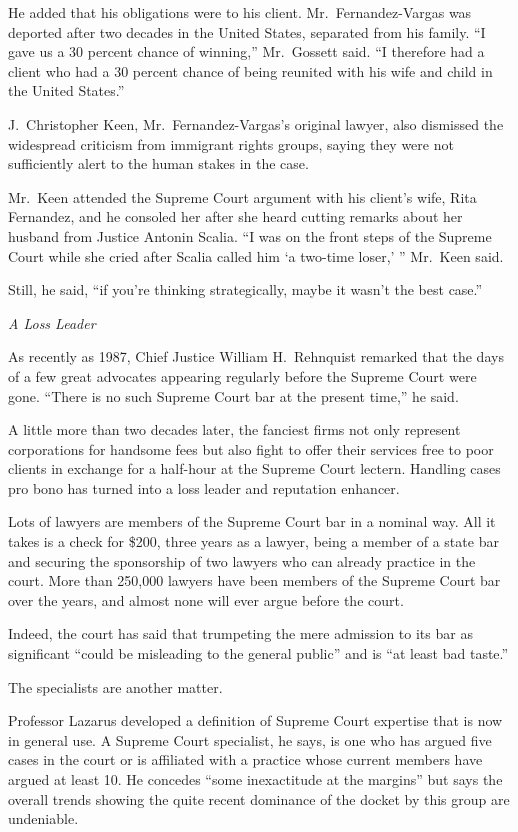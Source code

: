 ﻿\documentclass[12pt]{article}
\begin{document}
He added that his obligations were to his client. Mr.~Fernandez-Vargas was deported after two
decades in the United States, separated from his family. ``I gave us a 30 percent chance of
winning,'' Mr.~Gossett said. ``I therefore had a client who had a 30 percent chance of being
reunited with his wife and child in the United States.''

J.~Christopher Keen, Mr.~Fernandez-Vargas's original lawyer, also dismissed the widespread criticism
from immigrant rights groups, saying they were not sufficiently alert to the human stakes in the
case.

Mr.~Keen attended the Supreme Court argument with his client's wife, Rita Fernandez, and he consoled
her after she heard cutting remarks about her husband from Justice Antonin Scalia. ``I was on the
front steps of the Supreme Court while she cried after Scalia called him `a two-time loser,' ''
Mr.~Keen said.

Still, he said, ``if you're thinking strategically, maybe it wasn't the best case.''

\emph{A Loss Leader}

As recently as 1987, Chief Justice William H.~Rehnquist remarked that the days of a few great
advocates appearing regularly before the Supreme Court were gone. ``There is no such Supreme Court
bar at the present time,'' he said.

A little more than two decades later, the fanciest firms not only represent corporations for
handsome fees but also fight to offer their services free to poor clients in exchange for a
half-hour at the Supreme Court lectern. Handling cases pro bono has turned into a loss leader and
reputation enhancer.

Lots of lawyers are members of the Supreme Court bar in a nominal way. All it takes is a check for
\$200, three years as a lawyer, being a member of a state bar and securing the sponsorship of two
lawyers who can already practice in the court. More than 250,000 lawyers have been members of the
Supreme Court bar over the years, and almost none will ever argue before the court.

Indeed, the court has said that trumpeting the mere admission to its bar as significant ``could be
misleading to the general public'' and is ``at least bad taste.''

The specialists are another matter.

Professor Lazarus developed a definition of Supreme Court expertise that is now in general use. A
Supreme Court specialist, he says, is one who has argued five cases in the court or is affiliated
with a practice whose current members have argued at least 10. He concedes ``some inexactitude at
the margins'' but says the overall trends showing the quite recent dominance of the docket by this
group are undeniable.
\end{document}
